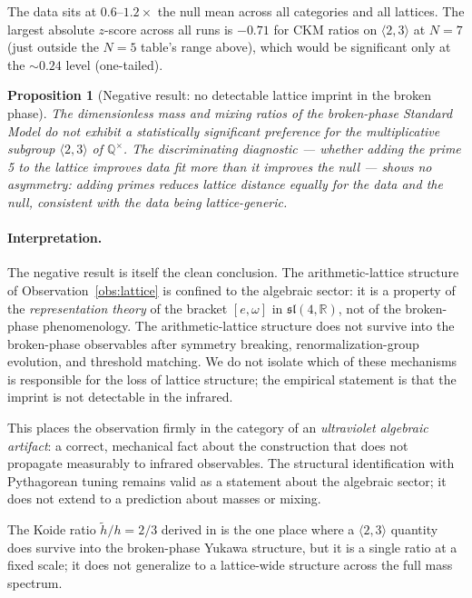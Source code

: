 \documentclass[11pt]{article}
\theoremstyle{plain}
\newtheorem{proposition}{Proposition}
\theoremstyle{remark}
\newcommand{\sln}[1]{\mathfrak{sl}(#1,\mathbb{R})}
\begin{document}
The data sits at $0.6$--$1.2 \times$ the null mean across all categories
and all lattices.  The largest absolute $z$-score across all runs is $-0.71$ for
CKM ratios on $\langle 2, 3 \rangle$ at $N = 7$ (just outside the
$N = 5$ table's range above), which would be
significant only at the $\sim\!\!0.24$ level (one-tailed).

\begin{proposition}[Negative result: no detectable lattice imprint
in the broken phase]
\label{prop:no-imprint}
The dimensionless mass and mixing ratios of the broken-phase
Standard Model do not exhibit a statistically significant preference
for the multiplicative subgroup $\langle 2, 3 \rangle$ of
$\mathbb{Q}^\times$.  The discriminating diagnostic --- whether
adding the prime 5 to the lattice improves data fit more than it
improves the null --- shows no asymmetry: adding primes reduces
lattice distance equally for the data and the null, consistent with
the data being lattice-generic.
\end{proposition}

\paragraph{Interpretation.}
The negative result is itself the clean conclusion.  The
arithmetic-lattice structure of Observation~\ref{obs:lattice} is
confined to the algebraic sector: it is a property of the
\emph{representation theory} of the bracket $[e, \omega]$ in $\sln{4}$,
not of the broken-phase phenomenology.  The arithmetic-lattice
structure does not survive into the broken-phase observables after
symmetry breaking, renormalization-group evolution, and threshold
matching.  We do not isolate which of these mechanisms is responsible
for the loss of lattice structure; the empirical statement is that
the imprint is not detectable in the infrared.

This places the observation firmly in the category of an
\emph{ultraviolet algebraic artifact}: a correct, mechanical fact
about the construction that does not propagate measurably to
infrared observables.  The structural identification with
Pythagorean tuning remains valid as a statement about the algebraic
sector; it does not extend to a prediction about masses or mixing.

The Koide ratio $\tilde h / h = 2/3$ derived in
\cite{WallaceA} is the one place where a $\langle 2, 3 \rangle$
quantity does survive into the broken-phase Yukawa structure, but
it is a single ratio at a fixed scale; it does not generalize
to a lattice-wide structure across the full mass spectrum.
\end{document}
